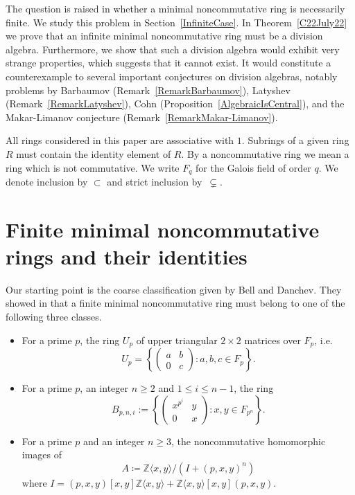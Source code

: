 \documentclass[11pt]{article}
\theoremstyle{definition}
\begin{document}
The question is raised in \cite[Remark~2.6]{BellandDanchev} whether a minimal noncommutative ring is necessarily finite. We study this problem in Section~\ref{InfiniteCase}. In Theorem~\ref{C22July22} we prove that an infinite minimal noncommutative ring must be a division algebra. Furthermore, we show that such a division algebra would exhibit very strange properties, which suggests that it cannot exist. It would constitute a counterexample to several important conjectures on division algebras, notably problems by Barbaumov (Remark~\ref{RemarkBarbaumov}), Latyshev (Remark~\ref{RemarkLatyshev}), 
Cohn (Proposition~\ref{AlgebraicIsCentral}), and the Makar-Limanov conjecture (Remark~\ref{RemarkMakar-Limanov}).


All rings considered in this paper are associative with $1$. Subrings of a given ring $R$ must contain the identity element of $R$. By a noncommutative ring we mean a ring which is not commutative. We write $F_q$ for the Galois field of order $q$. We denote inclusion by $\subset$ and strict inclusion by~$\subsetneq$. 

\section{Finite minimal noncommutative rings and their identities}\label{FiniteCaseandIdentities}

Our starting point is the coarse classification given by Bell and Danchev. They showed in \cite[Theorem~2.5]{BellandDanchev} that a finite minimal noncommutative ring must belong to one of the following three classes.

\begin{itemize}[topsep=0pt]
\item[(1)] For a prime $p$, the ring $U_p$ of upper triangular $2\times 2$ matrices over $F_p$, i.e.
\[U_p=\left\lbrace\begin{pmatrix}
a&b\\
0&c
\end{pmatrix}
:a,b,c\in F_p\right\rbrace.\]
\item[(2)] For a prime $p$, an integer $n\geq 2$ and $1\leq i\leq n-1$, the ring
\[B_{p,n,i}:=\left\lbrace\begin{pmatrix}
x^{p^i}&y\\
0&x
\end{pmatrix}
:x,y\in F_{p^n}\right\rbrace.\]
\item[(3)] For a prime $p$ and an integer $n\geq3$, the noncommutative homomorphic images of
\[A\coloneqq \mathbb{Z}\langle x,y\rangle/\left(I+(p,x,y)^n\right)\]
where $I=(p,x,y)[x,y]\mathbb{Z}\langle x,y\rangle+\mathbb{Z}\langle x,y\rangle[x,y](p,x,y)$.
\end{itemize}
\end{document}
